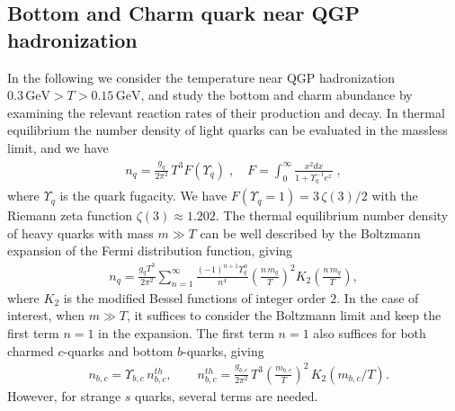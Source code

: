 \subsection{Bottom and Charm quark near QGP hadronization}
In the following we consider the temperature near QGP hadronization $0.3\,\mathrm{GeV}>T>0.15\,\mathrm{GeV}$, and study the bottom and charm abundance by examining the relevant reaction rates of their production and decay.
In thermal equilibrium the number density of light quarks can be evaluated in the massless limit, and we have
\begin{align}\label{FermiN}
n_q=\frac{g_{q}}{2\pi^2}\,T^3 F(\Upsilon_q)\;, \quad F=\int_0^\infty \frac{x^2dx}{1+\Upsilon_q^{-1}e^x}\;,
\end{align}
where $\Upsilon_q$ is the quark fugacity. We have $ F(\Upsilon_q=1)=3\,\zeta(3)/2$ with the Riemann zeta function $\zeta(3)\approx1.202$.
The thermal equilibrium number density of heavy quarks with mass $m\gg T$ can be well described by the Boltzmann expansion of the Fermi distribution function, giving
\begin{align}\label{BoltzN}
n_{q}\!=\!\frac{g_{q}T^3}{2\pi^2}\sum_{n=1}^{\infty}\frac{(-1)^{n+1}\Upsilon_q^n}{n^4}\left(\frac{n\,m_{q}}{T}\right)^{\!2}\!K_2\left(\frac{n\,m_{q}}{T}\right),
\end{align} 
where $K_2$ is the modified Bessel functions of integer order $2$. In the case of interest, when $m\gg T$, it suffices to consider the Boltzmann limit and  keep the first term $n=1$ in the expansion. The first term  $n=1$ also suffices for both charmed $c$-quarks and bottom $b$-quarks, giving
\begin{align}
&n_{b,c}={\Upsilon_{b,c}\,}n^{th}_{b,c},\qquad n^{th}_{b,c}=\frac{g_{b,c}}{2\pi^2}\,T^3\left(\frac{m_{b,c}}{T}\right)^2\,K_2(m_{b,c}/T).
\end{align}
However, for strange $s$ quarks, several terms are needed. 
